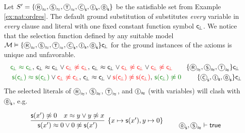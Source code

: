 \begin{example}\label{ex:nat:instgen}
	Let \( S' = \{
		\axiom{R}_\mEQ, \axiom{S}_\mEQ, \axiom{T}_\mEQ,
		\axiom{C}_\msucc, \axiom{I}_\msucc, \axiom{0}_\msucc
		\}\) 
		be the satisfiable set from Example \vref{ex:nat:ordres}.
	The default ground substitution of \InstGen{} substitutes \emph{every} 
	variable in \emph{every} clause and literal with one fixed constant function symbol \( \mathsf{c} \!_\bot \). 
	We notice that the selection function defined 
	by any suitable model \(
		\mcM \entails \{
			\axiom{R}_\mEQ, \axiom{S}_\mEQ, \axiom{T}_\mEQ,
			\axiom{C}_\msucc, \axiom{I}_\msucc, \axiom{0}_\msucc
			\}\consbot
	\) for the ground instances of the axioms is unique and unfavorable.
	\begin{align*}
	{ \colHi \consbot \mEQ \consbot },\,
	{ \consbot \mEQ \consbot} \lor { \colLo \consbot \mNE \consbot }
	,\,
	{ \consbot \mEQ \consbot}
	\lor {\colLo \consbot \mNE \consbot}
	\lor {\colLo \consbot\mNE \consbot}
	\tag*{\( \{\axiom{R}_\mEQ, \axiom{S}_\mEQ, \axiom{T}_\mEQ\}\consbot \) }\\
	{\colHi \msucc(\consbot) \mEQ \msucc(\consbot)} \lor {\colLo \consbot \mNE \consbot}
	,\,
	{ \consbot \mEQ \consbot} \lor {\colLo \msucc(\consbot) \mNE \msucc(\consbot)}
	,\,
	{\colHi \msucc(\consbot) \mNE 0}
	\tag*{ \( \{\axiom{C}_\msucc, \axiom{I}_\msucc, \axiom{0}_\msucc \}\consbot \)}
	\end{align*}
	The selected literals of 
	\(\axiom{R}_\mEQ\), \(\axiom{S}_\mEQ\), \(\axiom{T}_\mEQ\), and \(\axiom{I}_\mEQ\) 
	(with variables) will clash with
	\(\axiom{0}_\msucc\), e.g.

	\begin{align*}
		\infer[\{ x\mapsto \msucc(x'), y\mapsto 0 \}]{
			\msucc(x') \mEQ 0 \lor 0 \mNE \msucc(x')
		}{
			\msucc(x')\mNE 0 & x \mEQ y  \lor y \mNE x
		}
		\tag*{ \( \axiom{0}_\msucc, \axiom{S}_\mEQ \proves \true \)}
		\end{align*}


\end{example}
